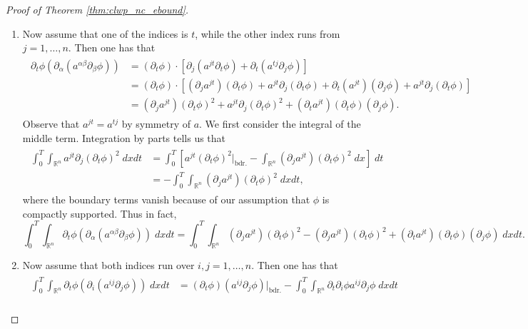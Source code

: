 \documentclass{article}
\begin{document}
\begin{proof}[Proof of Theorem \ref{thm:clwp_nc_ebound}]
\begin{enumerate}[itemsep =-2pt,label = (\arabic{*})]
		\item Now assume that one of the indices is $t$, while the other index runs from $j = 1, \ldots, n$. Then one has that 
		\begin{align*}
			\begin{split}
				\partial_{t}\phi(\partial_{\alpha}(a^{\alpha\beta}\partial_{\beta}\phi)) &= (\partial_{t}\phi) \cdot \left[\partial_{j}(a^{jt}\partial_{t}\phi) + \partial_{t}(a^{tj}\partial_{j}\phi)\right] \\
				&= (\partial_{t}\phi) \cdot \left[(\partial_{j}a^{jt})(\partial_{t}\phi) + a^{jt}\partial_{j}(\partial_{t}\phi) + \partial_{t}(a^{jt})(\partial_{j}\phi) + a^{jt}\partial_{j}(\partial_{t}\phi)\right] \\
				&= (\partial_{j}a^{jt})(\partial_{t}\phi)^{2} + a^{jt}\partial_{j}(\partial_{t}\phi)^{2} + (\partial_{t}a^{jt})(\partial_{t}\phi)(\partial_{j}\phi). 
			\end{split}
		\end{align*}
		Observe that $a^{jt} = a^{tj}$ by symmetry of $a$. We first consider the integral of the middle term. Integration by parts tells us that 
		\begin{align*}
			\begin{split}
				\int_{0}^{T}\int_{\mathbb{R}^{n}}a^{jt}\partial_{j}(\partial_{t}\phi)^{2}\;dx dt &= \int_{0}^{T} \left[a^{jt}(\partial_{t}\phi)^{2}|_{\text{bdr.}} - \int_{\mathbb{R}^{n}}(\partial_{j}a^{jt})(\partial_{t}\phi)^{2}\;dx\right]\;dt \\
				&= -\int_{0}^{T}\int_{\mathbb{R}^{n}}(\partial_{j}a^{jt})(\partial_{t}\phi)^{2}\;dxdt, 
			\end{split}
		\end{align*}
		where the boundary terms vanish because of our assumption that $\phi$ is compactly supported. Thus in fact, 
		\begin{equation*}
			\int_{0}^{T}\int_{\mathbb{R}^{n}}\partial_{t}\phi(\partial_{\alpha}(a^{\alpha\beta}\partial_{\beta}\phi))\;dxdt = \int_{0}^{T}\int_{\mathbb{R}^{n}}(\partial_{j}a^{jt})(\partial_{t}\phi)^{2} - (\partial_{j}a^{jt})(\partial_{t}\phi)^{2} + (\partial_{t}a^{jt})(\partial_{t}\phi)(\partial_{j}\phi)\;dx dt. 
		\end{equation*}
		\item Now assume that both indices run over $i, j = 1, \ldots, n$. Then one has that  
		\begin{align*}
			\begin{split}
				\int_{0}^{T}\int_{\mathbb{R}^{n}}\partial_{t}\phi (\partial_{i}(a^{ij}\partial_{j}\phi))\;dxdt &= (\partial_{t}\phi)(a^{ij}\partial_{j}\phi)\bigg|_{\text{bdr.}} - \int_{0}^{T}\int_{\mathbb{R}^{n}}\partial_{t}\partial_{i}\phi a^{ij}\partial_{j}\phi\;dx dt \\

\end{split}
\end{align*}
\end{enumerate}
\end{proof}
\end{document}
